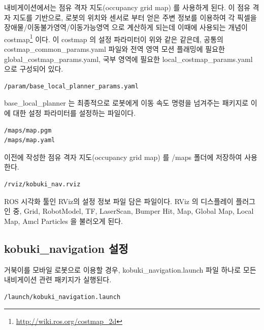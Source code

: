 내비게이션에서는 점유 격자 지도(occupancy grid map) 를 사용하게 된다. 이 점유 격자 지도를 기반으로, 로봇의 위치와 센서로 부터 얻은 주변 정보를 이용하여 각 픽셀을 장애물/이동불가영역/이동가능영역 으로 계산하게 되는데 이때에 사용되는 개념이 costmap\footnote{\url{http://wiki.ros.org/costmap_2d}} 이다. 이 costmap 의 설정 파라미터이 위와 같은 같은데, 공통의 costmap\_common\_params.yaml 파일와 전역 영역 모션 플래밍에 필요한 global\_costmap\_params.yaml, 국부 영역에 필요한 local\_costmap\_params.yaml 으로 구성되어 있다.

\vspace{\baselineskip}
\begin{lstlisting}[language=ROS]
/param/base_local_planner_params.yaml
\end{lstlisting}

base\_local\_planner 는 최종적으로 로봇에게 이동 속도 명령을 넘겨주는 패키지로 이에 대한 설정 파라미터를 설정하는 파일이다.

\vspace{\baselineskip}
\begin{lstlisting}[language=ROS]
/maps/map.pgm
/maps/map.yaml
\end{lstlisting}

이전에 작성한 점유 격자 지도(occupancy grid map) 를 /maps 폴더에 저장하여 사용한다.

\vspace{\baselineskip}
\begin{lstlisting}[language=ROS]
/rviz/kobuki_nav.rviz
\end{lstlisting}

ROS 시각화 툴인 RViz의 설정 정보 파일 담은 파일이다. RViz 의 디스플레이 플러그인 중, Grid, RobotModel, TF, LaserScan, Bumper Hit, Map, Global Map, Local Map, Amcl Particles 을 불러오게 된다.

\subsection{kobuki\_navigation 설정}

거북이를 모바일 로봇으로 이용할 경우, kobuki\_navigation.launch 파일 하나로 모든 내비게이션 관련 패키지가 실행된다. 

\vspace{\baselineskip}
\begin{lstlisting}[language=ROS]
/launch/kobuki_navigation.launch
\end{lstlisting}

